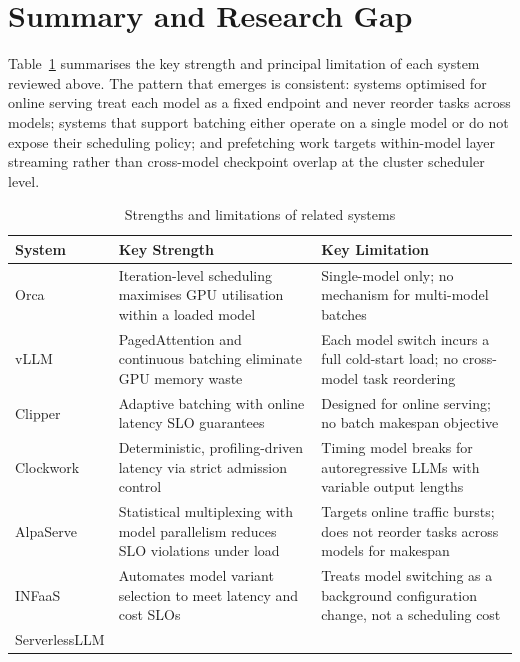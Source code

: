 \documentclass[logo,bsc,singlespacing,parskip,online]{infthesis}
\begin{document}
\section{Summary and Research Gap}

Table~\ref{tab:related_work_strengths} summarises the key strength and principal limitation of each system reviewed above. The pattern that emerges is consistent: systems optimised for online serving treat each model as a fixed endpoint and never reorder tasks across models; systems that support batching either operate on a single model or do not expose their scheduling policy; and prefetching work targets within-model layer streaming rather than cross-model checkpoint overlap at the cluster scheduler level.

\begin{table}[htbp]
\centering
\caption{Strengths and limitations of related systems}
\label{tab:related_work_strengths}
\begin{tabular}{p{3.0cm} p{5.0cm} p{5.0cm}}
\toprule
\textbf{System} & \textbf{Key Strength} & \textbf{Key Limitation} \\
\midrule
Orca \citep{yu2022orca}
  & Iteration-level scheduling maximises GPU utilisation within a loaded model
  & Single-model only; no mechanism for multi-model batches \\
\addlinespace
vLLM \citep{kwon2023efficient}
  & PagedAttention and continuous batching eliminate GPU memory waste
  & Each model switch incurs a full cold-start load; no cross-model task reordering \\
\addlinespace
Clipper \citep{crankshaw2017clipper}
  & Adaptive batching with online latency SLO guarantees
  & Designed for online serving; no batch makespan objective \\
\addlinespace
Clockwork \citep{gujarati2020serving}
  & Deterministic, profiling-driven latency via strict admission control
  & Timing model breaks for autoregressive LLMs with variable output lengths \\
\addlinespace
AlpaServe \citep{li2023alpaserve}
  & Statistical multiplexing with model parallelism reduces SLO violations under load
  & Targets online traffic bursts; does not reorder tasks across models for makespan \\
\addlinespace
INFaaS \citep{romero2021infaas}
  & Automates model variant selection to meet latency and cost SLOs
  & Treats model switching as a background configuration change, not a scheduling cost \\
\addlinespace
ServerlessLLM \citep{fu2024serverlessllm}

\end{tabular}
\end{table}
\end{document}
